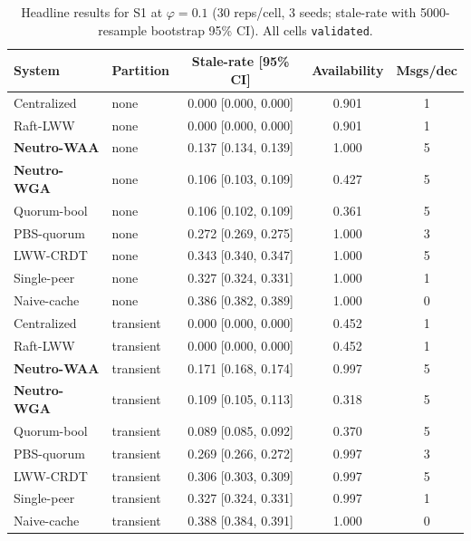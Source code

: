 \begin{table}[t]
\centering
\small
\caption{Headline results for S1 at $\varphi=0.1$ (30 reps/cell, 3 seeds; stale-rate with 5000-resample bootstrap 95\% CI). All cells \texttt{validated}.}
\label{tab:headline-s1}
\begin{tabular}{llccc}
\toprule
System & Partition & Stale-rate [95\% CI] & Availability & Msgs/dec \\
\midrule
Centralized & none & 0.000 [0.000, 0.000] & 0.901 & 1 \\
Raft-LWW & none & 0.000 [0.000, 0.000] & 0.901 & 1 \\
\textbf{Neutro-WAA} & none & 0.137 [0.134, 0.139] & 1.000 & 5 \\
\textbf{Neutro-WGA} & none & 0.106 [0.103, 0.109] & 0.427 & 5 \\
Quorum-bool & none & 0.106 [0.102, 0.109] & 0.361 & 5 \\
PBS-quorum & none & 0.272 [0.269, 0.275] & 1.000 & 3 \\
LWW-CRDT & none & 0.343 [0.340, 0.347] & 1.000 & 5 \\
Single-peer & none & 0.327 [0.324, 0.331] & 1.000 & 1 \\
Naive-cache & none & 0.386 [0.382, 0.389] & 1.000 & 0 \\
Centralized & transient & 0.000 [0.000, 0.000] & 0.452 & 1 \\
Raft-LWW & transient & 0.000 [0.000, 0.000] & 0.452 & 1 \\
\textbf{Neutro-WAA} & transient & 0.171 [0.168, 0.174] & 0.997 & 5 \\
\textbf{Neutro-WGA} & transient & 0.109 [0.105, 0.113] & 0.318 & 5 \\
Quorum-bool & transient & 0.089 [0.085, 0.092] & 0.370 & 5 \\
PBS-quorum & transient & 0.269 [0.266, 0.272] & 0.997 & 3 \\
LWW-CRDT & transient & 0.306 [0.303, 0.309] & 0.997 & 5 \\
Single-peer & transient & 0.327 [0.324, 0.331] & 0.997 & 1 \\
Naive-cache & transient & 0.388 [0.384, 0.391] & 1.000 & 0 \\
\bottomrule
\end{tabular}
\end{table}
